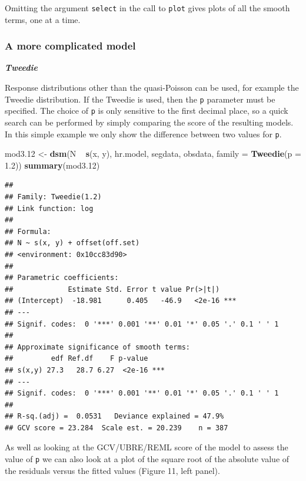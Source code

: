 \documentclass[]{article}
\newenvironment{Shaded}{}{}
\newcommand{\KeywordTok}[1]{\textcolor[rgb]{0.00,0.44,0.13}{\textbf{{#1}}}}
\newcommand{\DataTypeTok}[1]{\textcolor[rgb]{0.56,0.13,0.00}{{#1}}}
\newcommand{\FloatTok}[1]{\textcolor[rgb]{0.25,0.63,0.44}{{#1}}}
\newcommand{\StringTok}[1]{\textcolor[rgb]{0.25,0.44,0.63}{{#1}}}
\newcommand{\NormalTok}[1]{{#1}}
\begin{document}
Omitting the argument \texttt{select} in the call to \texttt{plot} gives
plots of all the smooth terms, one at a time.

\subsubsection{A more complicated model}\label{a-more-complicated-model}

\textbf{\emph{Tweedie}}

Response distributions other than the quasi-Poisson can be used, for
example the Tweedie distribution. If the Tweedie is used, then the
\texttt{p} parameter must be specified. The choice of \texttt{p} is only
sensitive to the first decimal place, so a quick search can be performed
by simply comparing the score of the resulting models. In this simple
example we only show the difference between two values for \texttt{p}.

\begin{Shaded}
\begin{Highlighting}[]
\NormalTok{mod3}\FloatTok{.12} \NormalTok{<-}\StringTok{ }\KeywordTok{dsm}\NormalTok{(N ~}\StringTok{ }\KeywordTok{s}\NormalTok{(x, y), hr.model, segdata, obsdata, }\DataTypeTok{family =} \KeywordTok{Tweedie}\NormalTok{(}\DataTypeTok{p =} \FloatTok{1.2}\NormalTok{))}
\KeywordTok{summary}\NormalTok{(mod3}\FloatTok{.12}\NormalTok{)}
\end{Highlighting}
\end{Shaded}

\begin{verbatim}
## 
## Family: Tweedie(1.2) 
## Link function: log 
## 
## Formula:
## N ~ s(x, y) + offset(off.set)
## <environment: 0x10cc83d90>
## 
## Parametric coefficients:
##             Estimate Std. Error t value Pr(>|t|)    
## (Intercept)  -18.981      0.405   -46.9   <2e-16 ***
## ---
## Signif. codes:  0 '***' 0.001 '**' 0.01 '*' 0.05 '.' 0.1 ' ' 1
## 
## Approximate significance of smooth terms:
##         edf Ref.df    F p-value    
## s(x,y) 27.3   28.7 6.27  <2e-16 ***
## ---
## Signif. codes:  0 '***' 0.001 '**' 0.01 '*' 0.05 '.' 0.1 ' ' 1
## 
## R-sq.(adj) =  0.0531   Deviance explained = 47.9%
## GCV score = 23.284  Scale est. = 20.239    n = 387
\end{verbatim}

As well as looking at the GCV/UBRE/REML score of the model to assess the
value of \texttt{p} we can also look at a plot of the square root of the
absolute value of the residuals versus the fitted values (Figure 11,
left panel).
\end{document}
